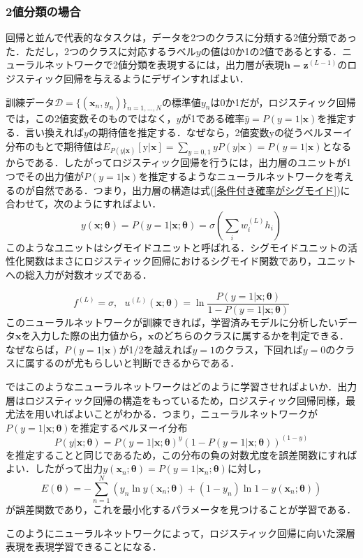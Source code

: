 \documentclass[a4paper,11pt]{jsreport}
\begin{document}
\subsubsection*{2値分類の場合}
回帰と並んで代表的なタスクは，データを2つのクラスに分類する2値分類であった．ただし，2つのクラスに対応するラベル$y$の値は0か1の2値であるとする．ニューラルネットワークで2値分類を表現するには，出力層が表現$\bm{h} = \bm{z}^{(L-1)}$のロジスティック回帰を与えるようにデザインすればよい．\par
訓練データ$\mathcal{D} = \{ (\bm{x}_n, y_n) \}_{n=1,\dots ,N}$の標準値$y_n$は0か1だが，ロジスティック回帰では，この2値変数そのものではなく，$y$が1である確率$\hat{y} = P(y=1 | \bm{x})$を推定する．言い換えれば$y$の期待値を推定する．なぜなら，2値変数$\mathrm{y}$の従うベルヌーイ分布のもとで期待値は$E_{P(y | \bm{x})}[\mathrm{y} | \bm{x}] = \sum_{y=0,1} y P(y | \bm{x}) = P(y=1 | \bm{x})$となるからである．したがってロジスティック回帰を行うには，出力層のユニットが1つでその出力値が$P(y=1 | \bm{x})$を推定するようなニューラルネットワークを考えるのが自然である．つまり，出力層の構造は式(\ref{条件付き確率がシグモイド})に合わせて，次のようにすればよい．
\begin{equation}
  y(\bm{x}; \bm{\theta})
  = P(y=1 | \bm{x}; \bm{\theta})
  = \sigma\left( \sum_i w_i^{(L)} h_i \right)
\end{equation}
このようなユニットはシグモイドユニットと呼ばれる．シグモイドユニットの活性化関数はまさにロジスティック回帰におけるシグモイド関数であり，ユニットへの総入力が対数オッズである．\par
\begin{equation}
  f^{(L)} = \sigma, \ \ \
  u^{(L)}(\bm{x}; \bm{\theta}) = \ln{\frac{P(y=1 | \bm{x}; \bm{\theta})}{1 - P(y=1 | \bm{x}; \bm{\theta})}}
\end{equation}
このニューラルネットワークが訓練できれば，学習済みモデルに分析したいデータ$\bm{x}$を入力した際の出力値から，$\bm{x}$のどちらのクラスに属するかを判定できる．なぜならば，$P(y=1 | \bm{x})$が1/2を越えれば$y=1$のクラス，下回れば$y=0$のクラスに属するのが尤もらしいと判断できるからである．\par
ではこのようなニューラルネットワークはどのように学習させればよいか．出力層はロジスティック回帰の構造をもっているため，ロジスティック回帰同様，最尤法を用いればよいことがわかる．つまり，ニューラルネットワークが$P(y=1 | \bm{x};\bm{\theta})$を推定するベルヌーイ分布
\begin{equation}
  P(y | \bm{x}; \bm{\theta})
  = P(y = 1 | \bm{x}; \bm{\theta})^y (1 - P(y = 1 | \bm{x}; \bm{\theta}))^{(1-y)}
\end{equation}
を推定することと同じであるため，この分布の負の対数尤度を誤差関数にすればよい．したがって出力$y(\bm{x}_n; \bm{\theta}) = P(y=1 | \bm{x}_n; \bm{\theta})$に対し，
\begin{equation}
  E(\bm{\theta})
  = -\sum_{n=1}^N \left( y_n \ln{y(\bm{x}_n; \bm{\theta})}
  + (1 - y_n) \ln{1 - y(\bm{x}_n; \bm{\theta})} \right)
\end{equation}
が誤差関数であり，これを最小化するパラメータを見つけることが学習である．\par
このようにニューラルネットワークによって，ロジスティック回帰に向いた深層表現を表現学習できることになる．
\end{document}
